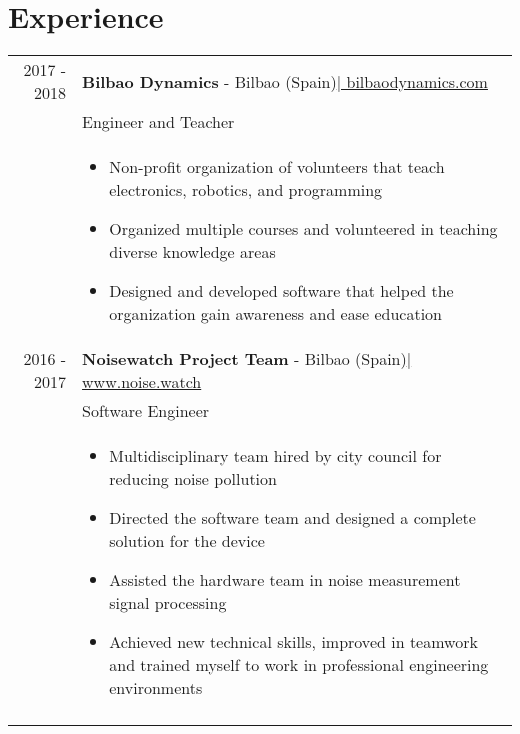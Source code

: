 \documentclass[a4paper,10pt]{article}
\begin{document}
\vspace{0.1in}


\section{Experience}
\begin{tabular}{rp{13.6cm}}

 \textsc{2017 - 2018}& \textbf{Bilbao Dynamics} - Bilbao (Spain)\href{https://bilbaodynamics.com/}{\hfill | \footnotesize bilbaodynamics.com}\\
 & Engineer and Teacher \\ 
 & \footnotesize{ \begin{itemize}[noitemsep,topsep=-10pt]
 \vspace{-0.1in}
 \item Non-profit organization of volunteers that teach electronics, robotics, and programming
 \item Organized multiple courses and volunteered in teaching diverse knowledge areas
 \item Designed and developed software that helped the organization gain awareness and ease education

 \end{itemize}} \\



 \textsc{2016 - 2017}& \textbf{Noisewatch Project Team} - Bilbao (Spain)\href{http://noise.watch}{\hfill | \footnotesize www.noise.watch}\\
 & Software Engineer \\
 & \footnotesize{ \begin{itemize}[noitemsep,topsep=40pt,nolistsep]
 \vspace{-0.1in}
 \item Multidisciplinary team hired by city council for reducing noise pollution
 \item Directed the software team and designed a complete solution for the device
 \item Assisted the hardware team in noise measurement signal processing
 \item Achieved new technical skills, improved in teamwork and trained myself to work in professional engineering environments
 \end{itemize}} \\ &\\


\end{tabular}
\end{document}
